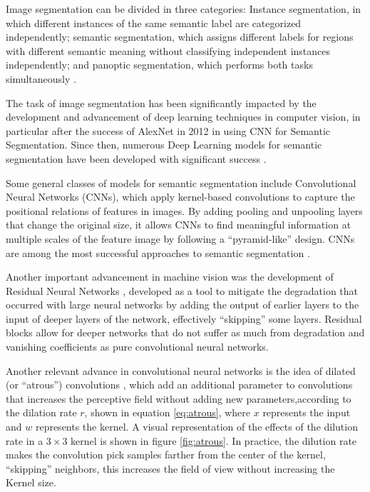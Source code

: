 \documentclass[10pt, conference]{IEEEtran}
\begin{document}
Image segmentation can be divided in three categories: Instance 
segmentation, in which different instances of the same semantic label 
are categorized independently; semantic segmentation, which assigns 
different labels for regions with different semantic meaning without 
classifying independent instances independently; and panoptic 
segmentation, which performs both tasks simultaneously \cite{Sultana2020}.

The task of image segmentation has been significantly impacted by the 
development and advancement of deep learning techniques in computer 
vision, in particular after the success of AlexNet in 2012 in using CNN 
for Semantic Segmentation. Since then, numerous Deep Learning models 
for semantic segmentation have been developed with significant 
success \cite{Sultana2020, Kale2021, Minaee2020}.

Some general classes of models for semantic segmentation include 
Convolutional Neural Networks (CNNs), which apply kernel-based 
convolutions to capture the positional relations of features in images. 
By adding pooling and unpooling layers that change the original size, 
it allows CNNs to find meaningful information at multiple scales of 
the feature image by following a ``pyramid-like'' design. CNNs are 
among the most successful approaches to semantic 
segmentation \cite{Minaee2020}.

Another important advancement in machine vision was the development 
of Residual Neural Networks \cite{He2016}, developed as a tool to 
mitigate the degradation that occurred with large neural networks 
by adding the output of earlier layers to the input of deeper layers 
of the network, effectively ``skipping'' some layers. Residual blocks 
allow for deeper networks that do not suffer as much from degradation 
and vanishing coefficients as pure convolutional neural networks.

Another relevant advance in convolutional neural networks is the idea 
of dilated (or ``atrous'') convolutions \cite{Minaee2020, Chen2017}, 
which add an additional parameter to convolutions that increases the 
perceptive field without adding new parameters,according to the dilation rate $r$,
shown in equation \ref{eq:atrous}, where $x$ represents the input and
$w$ represents the kernel. A visual representation of the effects of the
dilution rate in a $3 \times 3$ kernel is shown in figure \ref{fig:atrous}.
In practice, the dilution rate makes the convolution pick samples farther from
the center of the kernel, ``skipping'' neighbors, this increases the field
of view without increasing the Kernel size.
\end{document}
